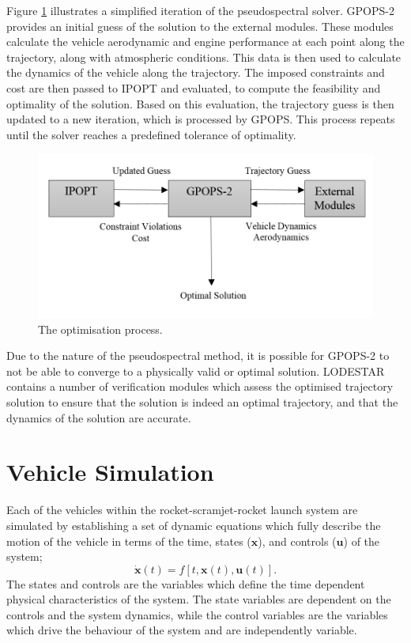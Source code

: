 Figure \ref{fig:FlowChartSmall} illustrates a simplified iteration of the pseudospectral solver. GPOPS-2 provides an initial guess of the solution to the external modules.
These modules calculate the vehicle aerodynamic and engine performance at each point along the trajectory, along with atmospheric conditions. This data is then used to calculate the dynamics of the vehicle along the trajectory. The imposed constraints and cost are then passed to IPOPT and evaluated, to compute the feasibility and optimality of the solution. Based on this evaluation, the trajectory guess is then updated to a new iteration, which is processed by GPOPS. This process repeats until the solver reaches a predefined tolerance of optimality.
\begin{figure}[ht]
	\centering
	\includegraphics[width=0.75\linewidth]{figures/4_LODESTAR/FlowChartSmall}
	\caption{The optimisation process.}
	\label{fig:FlowChartSmall}
\end{figure}
Due to the nature of the pseudospectral method, it is possible for GPOPS-2 to not be able to converge to a physically valid or optimal solution. 
LODESTAR contains a number of verification modules which assess the optimised trajectory solution to ensure that the solution is indeed an optimal trajectory, and that the dynamics of the solution are accurate. 



\section{Vehicle Simulation}


Each of the vehicles within the rocket-scramjet-rocket launch system are simulated by establishing a set of dynamic equations which fully describe the motion of the vehicle in terms of the time, states ($\mathbf{x}$), and controls ($\mathbf{u}$) of the system;
\begin{equation}
\dot{\textbf{x}}(t) = f[t,\textbf{x}(t),\textbf{u}(t)].
\end{equation}
 The states and controls are the variables which define the time dependent physical characteristics of the system. The state variables are dependent on the controls and the system dynamics, while the control variables are the variables which drive the behaviour of the system and are independently variable.  
 
